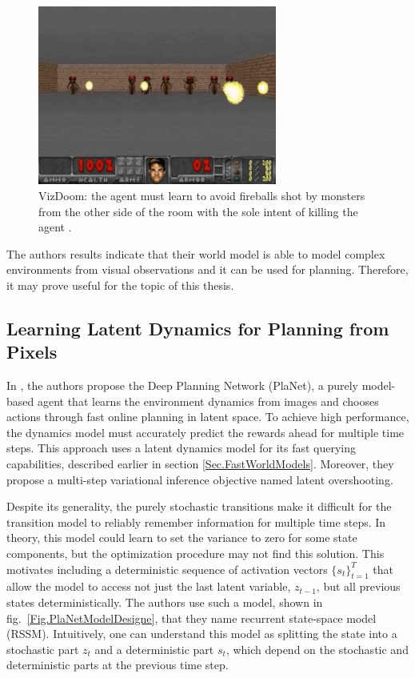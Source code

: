 \begin{figure}[H]
\includegraphics[width=0.7\textwidth,keepaspectratio]{figures/VizDoom.png}
\caption[VizDoom]{VizDoom: the agent must learn to avoid fireballs shot by monsters from the other side of the room with the sole intent of killing the agent \protect\cite{Algo.WorldModels}.}
\label{Fig.VizDoom}
\end{figure}

The authors results indicate that their world model is able to model complex environments from visual observations and it can be used for planning. Therefore, it may prove useful for the topic of this thesis.

\subsection{Learning Latent Dynamics for Planning from Pixels}

In \cite{Algo.PlaNet}, the authors propose the Deep Planning Network (PlaNet), a purely model-based agent that learns the environment dynamics from images and chooses actions through fast online planning in latent space. To achieve high performance, the dynamics model must accurately predict the rewards ahead for multiple time steps. This approach uses a latent dynamics model for its fast querying capabilities, described earlier in section \ref{Sec.FastWorldModels}. Moreover, they propose a multi-step variational inference objective named latent overshooting.

Despite its generality, the purely stochastic transitions make it difficult for the transition model to reliably remember information for multiple time steps. In theory, this model could learn to set the variance to zero for some state components, but the optimization procedure may not find this solution. This motivates including a deterministic sequence of activation vectors $\{s_t\}^T_{t=1}$ that allow the model to access not just the last latent variable, $z_{t-1}$, but all previous states deterministically. The authors use such a model, shown in fig.~\ref{Fig.PlaNetModelDesigne}, that they name recurrent state-space model (RSSM). Intuitively, one can understand this model as splitting the state into a stochastic part $z_t$ and a deterministic part $s_t$, which depend on the stochastic and deterministic parts at the previous time step.

